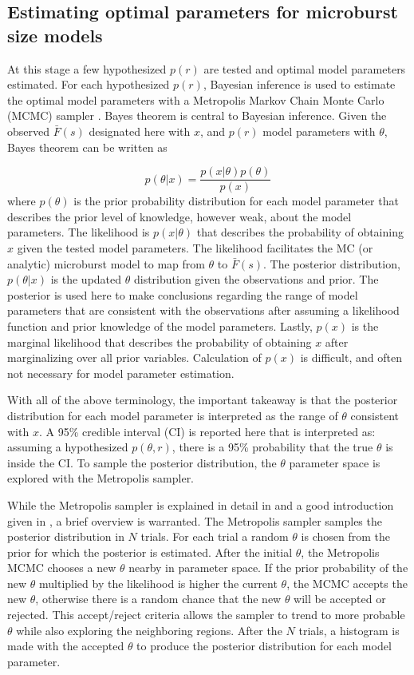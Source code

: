 \documentclass[draft]{agujournal2019}
\begin{document}
\subsection{Estimating optimal parameters for microburst size models}
At this stage a few hypothesized $p(r)$ are tested and optimal model parameters estimated. For each hypothesized $p(r)$, Bayesian inference is used to estimate the optimal model parameters with a Metropolis Markov Chain Monte Carlo (MCMC) sampler \cite{Metropolis1953}. Bayes theorem is central to Bayesian inference. Given the observed $\bar{F}(s)$ designated here with $x$, and $p(r)$ model parameters with $\theta$, Bayes theorem can be written as

\begin{equation}
p(\theta | x) = \frac{p(x | \theta) p(\theta)}{p(x)}
\end{equation} where $p(\theta)$ is the prior probability distribution for each model parameter that describes the prior level of knowledge, however weak, about the model parameters. The likelihood is $p(x | \theta)$ that describes the probability of obtaining $x$ given the tested model parameters. The likelihood facilitates the MC (or analytic) microburst model to map from $\theta$ to $\bar{F}(s)$. The posterior distribution, $p(\theta | x)$ is the updated $\theta$ distribution given the observations and prior. The posterior is used here to make conclusions regarding the range of model parameters that are consistent with the observations after assuming a likelihood function and prior knowledge of the model parameters. Lastly, $p(x)$ is the marginal likelihood that describes the probability of obtaining $x$ after marginalizing over all prior variables. Calculation of $p(x)$ is difficult, and often not necessary for model parameter estimation. 

With all of the above terminology, the important takeaway is that the posterior distribution for each model parameter is interpreted as the range of $\theta$ consistent with $x$. A 95\% credible interval (CI) is reported here that is interpreted as: assuming a hypothesized $p(\theta, r)$, there is a 95\% probability that the true $\theta$ is inside the CI. To sample the posterior distribution, the $\theta$ parameter space is explored with the Metropolis sampler.

While the Metropolis sampler is explained in detail in  and a good introduction given in , a brief overview is warranted. The Metropolis sampler samples the posterior distribution in $N$ trials. For each trial a random $\theta$ is chosen from the prior for which the posterior is estimated. After the initial $\theta$, the Metropolis MCMC chooses a new $\theta$ nearby in parameter space. If the prior probability of the new $\theta$ multiplied by the likelihood is higher the current $\theta$, the MCMC accepts the new $\theta$, otherwise there is a random chance that the new $\theta$ will be accepted or rejected. This accept/reject criteria allows the sampler to trend to more probable $\theta$ while also exploring the neighboring regions. After the $N$ trials, a histogram is made with the accepted $\theta$ to produce the posterior distribution for each model parameter.
\end{document}
